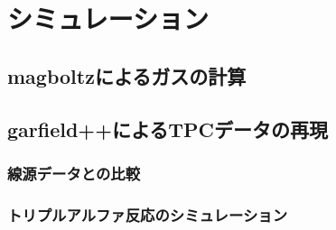 \chapter{シミュレーション}
\section{magboltzによるガスの計算}
\section{garfield++によるTPCデータの再現}
\subsection{線源データとの比較}
\subsection{トリプルアルファ反応のシミュレーション}
